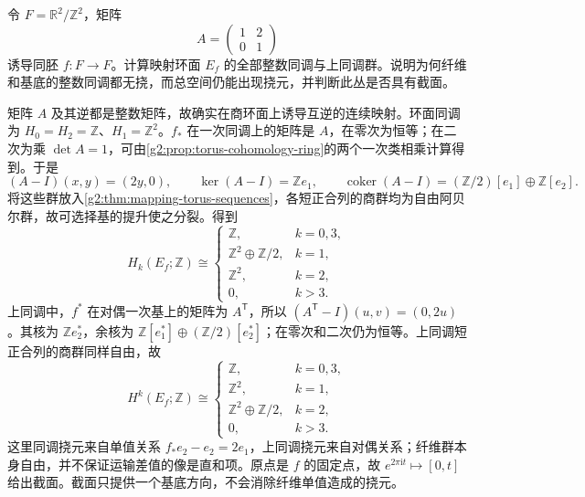 \begin{exercise}\label{g2:ex:torus-unipotent-mapping-torus}
	令 \(F=\mathbb R^2/\mathbb Z^2\)，矩阵
	\[
		A=\begin{pmatrix}1&2\\0&1\end{pmatrix}
	\]
	诱导同胚 \(f:F\to F\)。计算映射环面 \(E_f\) 的全部整数同调与上同调群。说明为何纤维和基底的整数同调都无挠，而总空间仍能出现挠元，并判断此丛是否具有截面。
\end{exercise}
\begin{solution}
	矩阵 \(A\) 及其逆都是整数矩阵，故确实在商环面上诱导互逆的连续映射。环面同调为 \(H_0=H_2=\mathbb Z\)、\(H_1=\mathbb Z^2\)。\(f_*\) 在一次同调上的矩阵是 \(A\)，在零次为恒等；在二次为乘 \(\det A=1\)，可由\cref{g2:prop:torus-cohomology-ring}的两个一次类相乘计算得到。于是
	\[
		(A-I)(x,y)=(2y,0),\qquad
		\ker(A-I)=\mathbb Ze_1,\qquad
		\operatorname{coker}(A-I)=(\mathbb Z/2)[e_1]\oplus\mathbb Z[e_2].
	\]
	将这些群放入\cref{g2:thm:mapping-torus-sequences}，各短正合列的商群均为自由阿贝尔群，故可选择基的提升使之分裂。得到
	\[
		H_k(E_f;\mathbb Z)\cong
		\begin{cases}
			\mathbb Z,&k=0,3,\\
			\mathbb Z^2\oplus\mathbb Z/2,&k=1,\\
			\mathbb Z^2,&k=2,\\
			0,&k>3.
		\end{cases}
	\]
	上同调中，\(f^*\) 在对偶一次基上的矩阵为 \(A^{\mathsf T}\)，所以 \((A^{\mathsf T}-I)(u,v)=(0,2u)\)。其核为 \(\mathbb Ze_2^*\)，余核为 \(\mathbb Z[e_1^*]\oplus(\mathbb Z/2)[e_2^*]\)；在零次和二次仍为恒等。上同调短正合列的商群同样自由，故
	\[
		H^k(E_f;\mathbb Z)\cong
		\begin{cases}
			\mathbb Z,&k=0,3,\\
			\mathbb Z^2,&k=1,\\
			\mathbb Z^2\oplus\mathbb Z/2,&k=2,\\
			0,&k>3.
		\end{cases}
	\]
	这里同调挠元来自单值关系 \(f_*e_2-e_2=2e_1\)，上同调挠元来自对偶关系；纤维群本身自由，并不保证运输差值的像是直和项。原点是 \(f\) 的固定点，故 \(e^{2\pi\mathrm{i}t}\mapsto[0,t]\) 给出截面。截面只提供一个基底方向，不会消除纤维单值造成的挠元。
\end{solution}

